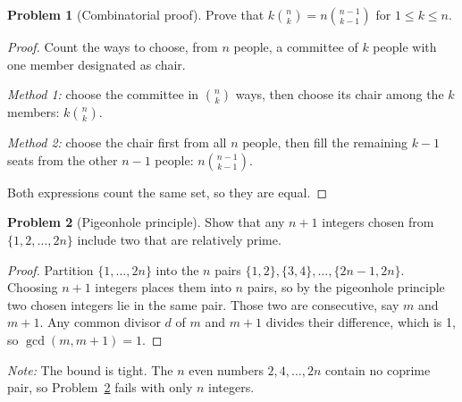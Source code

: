 \documentclass[11pt]{article}
\theoremstyle{definition}
\newtheorem{problem}{Problem}
\begin{document}
\begin{problem}[Combinatorial proof]\label{prob:committee}
Prove that $k\binom{n}{k} = n\binom{n-1}{k-1}$ for $1 \leq k \leq n$.
\end{problem}

\begin{proof}
Count the ways to choose, from $n$ people, a committee of $k$ people with one member designated as chair.

\emph{Method 1:} choose the committee in $\binom{n}{k}$ ways, then choose its chair among the $k$ members: $k\binom{n}{k}$.

\emph{Method 2:} choose the chair first from all $n$ people, then fill the remaining $k-1$ seats from the other $n-1$ people: $n\binom{n-1}{k-1}$.

Both expressions count the same set, so they are equal.
\end{proof}

\begin{problem}[Pigeonhole principle]\label{prob:pigeon}
Show that any $n + 1$ integers chosen from $\{1, 2, \dots, 2n\}$ include two that are relatively prime.
\end{problem}

\begin{proof}
Partition $\{1, \dots, 2n\}$ into the $n$ pairs $\{1,2\}, \{3,4\}, \dots, \{2n-1, 2n\}$. Choosing $n+1$ integers places them into $n$ pairs, so by the pigeonhole principle two chosen integers lie in the same pair. Those two are consecutive, say $m$ and $m+1$. Any common divisor $d$ of $m$ and $m+1$ divides their difference, which is 1, so $\gcd(m, m+1) = 1$.
\end{proof}

\noindent\emph{Note:} The bound is tight. The $n$ even numbers $2, 4, \dots, 2n$ contain no coprime pair, so Problem~\ref{prob:pigeon} fails with only $n$ integers.
\end{document}
